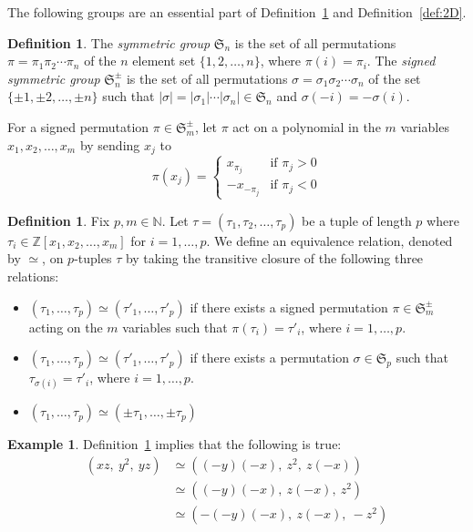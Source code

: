 \documentclass[12pt,table]{article}
\theoremstyle{definition}
\newtheorem{definition}[theorem]{Definition}
\newtheorem{example}[theorem]{Example}
\theoremstyle{remark}
\newcommand{\Nnn}{\mathbb N}
\newcommand{\Zzz}{\mathbb Z}
\numberwithin{equation}{section}
\begin{document}
The following groups are an essential part of Definition~\ref{def:general}
and Definition~\ref{def:2D}.
\begin{definition}
The {\em symmetric group} $ \mathfrak{S}_n $ is the 
set of all permutations $ \pi = \pi_1 \pi_2 \dotsm \pi_n $ 
of the $ n $ element set $ \{ 1, 2, \dotsc, n \} $,
where $ \pi(i) = \pi_i $.
The {\em signed symmetric group} $ \mathfrak{S}_n^\pm $
is the set of all permutations $ \sigma = \sigma_1 \sigma_2 \dotsm \sigma_n$
of the set $ \{ \pm 1, \pm 2, \dotsc, \pm n \} $ such that
$ | \sigma | = | \sigma_1 | \dotsm |\sigma_n| \in \mathfrak{S}_n $
and $ \sigma(-i) =  -\sigma(i) $.   
\end{definition}



For a signed permutation $ \pi \in \mathfrak{S}_m^\pm $,
let $ \pi $ act on a polynomial in the 
$m$ variables $ x_1,x_2, \dotsc, x_m $ by sending $ x_j $ to 
\[
\pi(x_j) =
\begin{cases}
x_{\pi_j} & \text{if } \pi_j > 0 \\
-x_{-\pi_j} & \text{if } \pi_j < 0
\end{cases}
\]

\begin{definition}
\label{def:general}
Fix $ p, m \in \Nnn $. 
Let $ \tau = ( \tau_1, \tau_2, \dotsc, \tau_p) $
be a tuple of length $ p $ where 
$ \tau_i \in \Zzz[x_1,x_2, \dotsc, x_m] $ for $ i = 1, \dotsc, p $.
We define an equivalence relation, denoted by $ \simeq $, on $p$-tuples
$ \tau $ 
by taking the transitive closure of the following three relations:
\begin{itemize}
\item
$ ( \tau_1, \dotsc, \tau_p) \simeq ( \tau'_1, \dotsc, \tau'_p) $
if there exists a signed permutation $ \pi \in \mathfrak{S}_m^\pm $
acting on the $ m $ variables such that $ \pi( \tau_i ) = \tau'_i $,
 where $ i = 1, \dotsc, p $.
\item
$ ( \tau_1, \dotsc, \tau_p) \simeq ( \tau'_1, \dotsc, \tau'_p) $
if there exists a permutation $ \sigma \in \mathfrak{S}_p $
such that $ \tau_{\sigma(i)} = \tau'_i $, where $ i = 1, \dotsc, p $.
\item
$ ( \tau_1, \dotsc, \tau_p) \simeq ( \pm \tau_1, \dotsc, \pm \tau_p) $
\end{itemize}
\end{definition}


\begin{example}
Definition~\ref{def:general} implies that the following is true:
\begin{align*}
( xz,\: y^2,\: yz )  
&\simeq ( (-y)(-x),\: z^2,\: z(-x) ) \\
&\simeq ( (-y)(-x),\: z(-x),\: z^2 ) \\
&\simeq ( -(-y)(-x),\: z(-x),\: -z^2 ) 
\end{align*}
\end{example}
\end{document}
